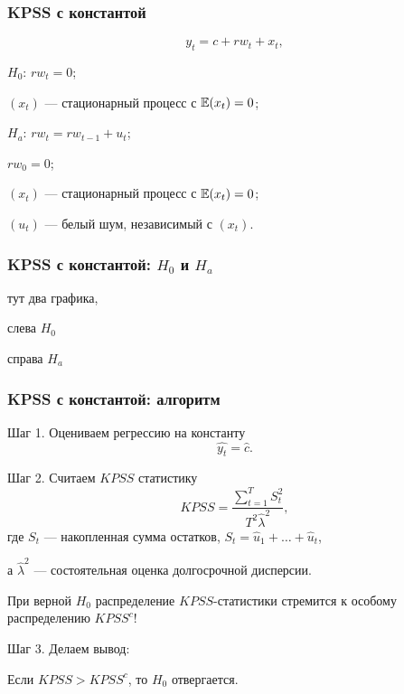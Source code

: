   
  \begin{frame}
    \frametitle{KPSS с константой}
    \[
      y_t = c + rw_t + x_t,
    \]
  
    \pause
  
    \alert{$H_0$: $rw_t = 0$};
    
    $(x_t)$ — стационарный процесс с $\mathbb{E}(x_t) = 0$;
    
    \pause
  
    \alert{$H_a$: $rw_t = rw_{t-1} + u_t$};

    $rw_0 = 0$;
  
    $(x_t)$ — стационарный процесс с $\mathbb{E}(x_t) = 0$;

    $(u_t)$ — белый шум, независимый с $(x_t)$.
  
  \end{frame}
  
  \begin{frame}
    \frametitle{KPSS с константой: $H_0$ и $H_a$}
  
  
    тут два графика,
  
  
    слева $H_0$
    
    справа $H_a$
  
  
  \end{frame}
  
  \begin{frame}
    \frametitle{KPSS с константой: алгоритм}
  
    Шаг 1. Оцениваем \alert{регрессию на константу} 
    \[
      \widehat{y_t} = \hat c.  
    \]
  
    \pause
    Шаг 2. Считаем $KPSS$ статистику
    \[
    KPSS = \frac{\sum_{t=1}^T S_t^2}{T^2 \hat \lambda^2},
    \]
    где $S_t$ — накопленная сумма остатков, $S_t = \hat u_1 + \ldots + \hat u_t$,

    а $\hat\lambda^2$ — состоятельная оценка долгосрочной дисперсии. 
  
    \pause
    При верной $H_0$ распределение $KPSS$-статистики стремится к \alert{особому распределению} $KPSS^c$!
  
    \pause 
    Шаг 3. Делаем вывод:
    
    Если $KPSS > KPSS^c$, то $H_0$ отвергается. 
  
  \end{frame}
  
